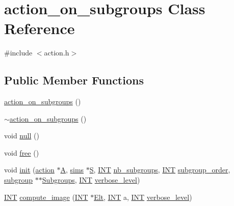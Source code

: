 \hypertarget{classaction__on__subgroups}{}\section{action\+\_\+on\+\_\+subgroups Class Reference}
\label{classaction__on__subgroups}


{\ttfamily \#include $<$action.\+h$>$}

\subsection*{Public Member Functions}
\begin{DoxyCompactItemize}
\item 
\mbox{\hyperlink{classaction__on__subgroups_a9e134910867f71d372528b9cb0bfccc5}{action\+\_\+on\+\_\+subgroups}} ()
\item 
\mbox{\hyperlink{classaction__on__subgroups_a1f1b28ccbd97e36588893eaf1f58e4a0}{$\sim$action\+\_\+on\+\_\+subgroups}} ()
\item 
void \mbox{\hyperlink{classaction__on__subgroups_ada42c75d9ba6148fb2c10d1e7e59f4be}{null}} ()
\item 
void \mbox{\hyperlink{classaction__on__subgroups_a60809c7ad139a3e98758048a0e0e6c97}{free}} ()
\item 
void \mbox{\hyperlink{classaction__on__subgroups_af974b4d4a7b840fe84009db7de78f261}{init}} (\mbox{\hyperlink{classaction}{action}} $\ast$\mbox{\hyperlink{classaction__on__subgroups_a3ed467feb9730471ea170c4cfc9cb0c3}{A}}, \mbox{\hyperlink{classsims}{sims}} $\ast$\mbox{\hyperlink{classaction__on__subgroups_a52bed626bba4cd40ef89132571bb51be}{S}}, \mbox{\hyperlink{galois_8h_a09fddde158a3a20bd2dcadb609de11dc}{I\+NT}} \mbox{\hyperlink{classaction__on__subgroups_a7373a10ec275b4ec5f7004e0860ed109}{nb\+\_\+subgroups}}, \mbox{\hyperlink{galois_8h_a09fddde158a3a20bd2dcadb609de11dc}{I\+NT}} \mbox{\hyperlink{classaction__on__subgroups_ad8b26fa522fdfd4d41f31b41c79ef7e5}{subgroup\+\_\+order}}, \mbox{\hyperlink{classsubgroup}{subgroup}} $\ast$$\ast$\mbox{\hyperlink{classaction__on__subgroups_a8b6b08b81e27df0cd045dc7f230c2279}{Subgroups}}, \mbox{\hyperlink{galois_8h_a09fddde158a3a20bd2dcadb609de11dc}{I\+NT}} \mbox{\hyperlink{simeon_8_c_a818073fbcc2f439e7c56952f67386122}{verbose\+\_\+level}})
\item 
\mbox{\hyperlink{galois_8h_a09fddde158a3a20bd2dcadb609de11dc}{I\+NT}} \mbox{\hyperlink{classaction__on__subgroups_a8d225ed63ea7287aecc5171cb2a49092}{compute\+\_\+image}} (\mbox{\hyperlink{galois_8h_a09fddde158a3a20bd2dcadb609de11dc}{I\+NT}} $\ast$\mbox{\hyperlink{simeon_8_c_aec1406935bdb1fee3561fcb840964100}{Elt}}, \mbox{\hyperlink{galois_8h_a09fddde158a3a20bd2dcadb609de11dc}{I\+NT}} a, \mbox{\hyperlink{galois_8h_a09fddde158a3a20bd2dcadb609de11dc}{I\+NT}} \mbox{\hyperlink{simeon_8_c_a818073fbcc2f439e7c56952f67386122}{verbose\+\_\+level}})
\end{DoxyCompactItemize}

